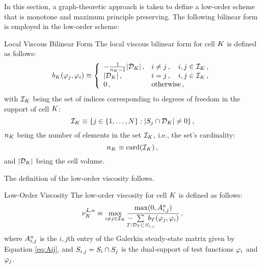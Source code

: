 In this section, a graph-theoretic approach is taken to define a low-order
scheme that is monotone and maximum principle preserving. The following
bilinear form is employed in the low-order scheme:
\begin{definition}{Local Viscous Bilinear Form}
   The local viscous bilinear form for cell $K$ is defined as follows:
   \begin{equation}\label{eq:bilinearform}
     \localviscbilinearform{\cell}{j}{i} \equiv \left\{\begin{array}{l l}
       -\frac{1}{\cardinality - 1}\cellvolume\eqc & i\ne j\eqc
       \quad i,j\in \indicescell\eqc \\
       \cellvolume\eqc & i = j \eqc \quad i,j\in \indicescell\eqc \\
       0          \eqc & \mbox{otherwise}\eqc
     \end{array}\right.
   \end{equation}
   with $\indicescell$ being the set of indices corresponding to degrees of
   freedom in the support of cell $K$:
   \begin{equation}
     \indicescell \equiv \{j\in\{1,\ldots,N\}: |\support_j\cap \celldomain|\ne 0\}
     \eqc
   \end{equation}
   $\cardinality$ being the number of elements in the set $\indicescell$,
   i.e., the set's cardinality:
   \begin{equation}
     \cardinality \equiv \textup{card}(\indicescell) \eqc
   \end{equation} 
   and $|\mathcal{D}_K|$ being the cell volume.
\end{definition}
The definition of the low-order viscosity follows.
\begin{definition}{Low-Order Viscosity}
   The low-order viscosity for cell $K$ is defined as follows:
   \begin{equation}
     \lowordercellviscosity[\timeindex] \equiv \max\limits_{i\ne j\in\indicescell}
     \frac{\max(0,\ssmatrixletter\ij^\timeindex)}
     {-\mkern-20mu\sumKSij[T]\mkern-20mu\localviscbilinearform{T}{j}{i}}
     \eqc
   \end{equation}
   where $A_{i,j}^n$ is the $i,j$th entry of the Galerkin
   steady-state matrix given by Equation \eqref{eq:Aij}, and
   $S_{i,j}=S_i\cap S_j$ is the dual-support of test
   functions $\varphi_i$ and $\varphi_j$.
\end{definition}
